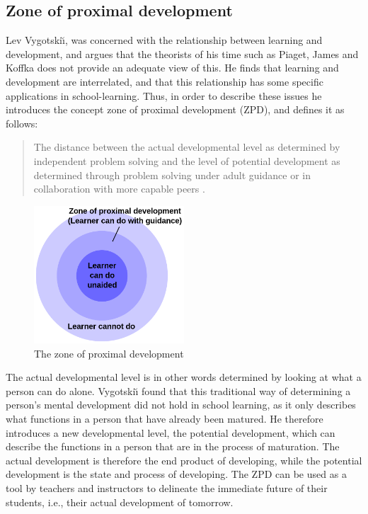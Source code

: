 \subsection{Zone of proximal development}
Lev Vygotski{\u\i}, was concerned with the relationship between learning and development, and argues that the theorists of his time such as Piaget, James and Koffka does not provide an adequate view of this. He finds that learning and development are interrelated, and that this relationship has some specific applications in school-learning. \citep[p. 84]{vygotskiui1978mind} Thus, in order to describe these issues he introduces the concept zone of proximal development (ZPD), and defines it as follows:

\begin{quote}The distance between the actual developmental level as determined by independent problem solving and the level of potential development as determined through problem solving under adult guidance or in collaboration with more capable peers \citep[p. 86]{vygotskiui1978mind}.
\end{quote}

\begin{figure}
\centering
\includegraphics[width=0.5\textwidth]{img/theoretical/zpd.png}
\caption{The zone of proximal development \citep{wiki:zpd}}
\label{fig:zpd}
\end{figure}

The actual developmental level is in other words determined by looking at what a person can do alone. Vygotski{\u\i} found that this traditional way of determining a person's mental development did not hold in school learning, as it only describes what functions in a person that have already been matured. He therefore introduces a new developmental level, the potential development, which can describe the functions in a person that are in the process of maturation. The actual development is therefore the end product of developing, while the potential development is the state and process of developing. The ZPD can be used as a tool by teachers and instructors to delineate the immediate future of their students, i.e., their actual development of tomorrow.

